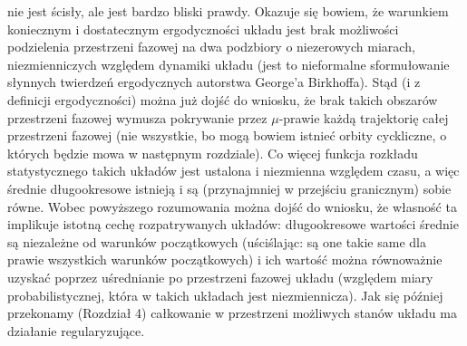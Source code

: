 \documentclass[12pt, twoside]{book}
\begin{document}
nie jest ścisły, ale jest bardzo bliski prawdy. Okazuje się bowiem, że warunkiem koniecznym i dostatecznym ergodyczności układu jest brak możliwości podzielenia przestrzeni fazowej na dwa podzbiory o niezerowych miarach, niezmienniczych względem dynamiki układu (jest to nieformalne sformułowanie słynnych twierdzeń ergodycznych autorstwa George'a Birkhoffa). Stąd (i z definicji ergodyczności) można już dojść do wniosku, że brak takich obszarów przestrzeni fazowej wymusza pokrywanie przez $ \mu $-prawie każdą trajektorię całej przestrzeni fazowej (nie wszystkie, bo mogą bowiem istnieć orbity cyckliczne, o których będzie mowa w następnym rozdziale). Co więcej funkcja rozkładu statystycznego takich układów jest ustalona i niezmienna względem czasu, a więc średnie długookresowe istnieją i są (przynajmniej w przejściu granicznym) sobie równe.  \newline 
Wobec powyższego rozumowania można dojść do wniosku, że własność ta implikuje istotną cechę rozpatrywanych układów: długookresowe wartości średnie są niezależne od warunków początkowych (uściślając: są one takie same dla prawie wszystkich warunków początkowych) i ich wartość można równoważnie uzyskać poprzez uśrednianie po przestrzeni fazowej układu (względem miary probabilistycznej, która w takich układach jest niezmiennicza). Jak się później przekonamy (Rozdział 4) całkowanie w przestrzeni możliwych stanów układu ma działanie regularyzujące. 
\end{document}
